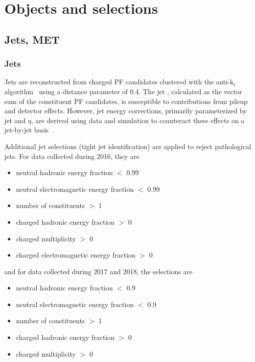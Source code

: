 \chapter{Objects and selections}
\label{chap:objects}

\section{Jets, MET}

\subsection{Jets}
Jets are reconstructed from charged PF candidates clustered with the
anti-$\mathrm{k_t}$ algorithm~\cite{CMS:Cacciari2008gp, CMS:Cacciari2011ma}
using a distance parameter of 0.4. The jet \pt, calculated as the vector sum
of the constituent PF candidates, is susceptible to contributions from pileup
and detector effects. However, jet energy corrections, primarily
parameterized by jet \pt and $\eta$, are derived using data and simulation to
counteract these effects on a jet-by-jet basis~\cite{CMS:Khachatryan2016kdb, CMS:PASJME16003}.

Additional jet selections (tight jet identification) are applied to reject
pathological jets. For data collected during 2016, they are
\begin{itemize}
    \item neutral hadronic energy fraction $<$ 0.99
    \item neutral electromagnetic energy fraction $<$ 0.99
    \item number of constituents $>$ 1
    \item charged hadronic energy fraction $>$ 0
    \item charged multiplicity $>$ 0
    \item charged electromagnetic energy fraction $>$ 0
\end{itemize}
\noindent and for data collected during 2017 and 2018, the selections are
\begin{itemize}
    \item neutral hadronic energy fraction $<$ 0.9
    \item neutral electromagnetic energy fraction $<$ 0.9
    \item number of constituents $>$ 1
    \item charged hadronic energy fraction $>$ 0
    \item charged multiplicity $>$ 0
\end{itemize}


